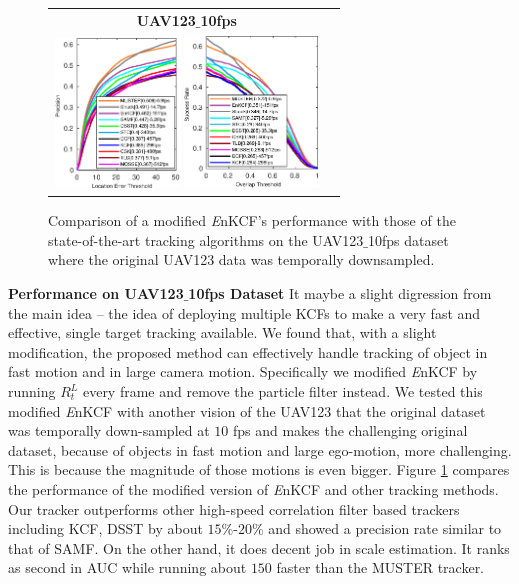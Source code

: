 \documentclass[10pt,twocolumn,letterpaper]{article}
\begin{document}
\begin{figure}[!h]
\centering
\begin{tabular}{cc}
\tiny\quad\textbf{UAV123$\_$10fps}\\
\includegraphics[width=3.30cm]{./figures/pr_uav123_10fps.eps}
\includegraphics[width=3.55cm]{./figures/sr_uav123_10fps.eps}\\
\end{tabular}
\caption{Comparison of a modified {\it E}nKCF's performance with those
  of the state-of-the-art tracking algorithms on the UAV123$\_$10fps
  dataset where the original UAV123 data was temporally downsampled.}
\label{fig:UAV123_10fpsDATASET}
\end{figure}

\textbf{Performance on UAV123$\_$10fps Dataset} It maybe a slight
digression from the main idea -- the idea of deploying multiple KCFs
to make a very fast and effective, single target tracking
available. We found that, with a slight modification, the proposed
method can effectively handle tracking of object in fast motion and in
large camera motion. Specifically we modified {\it E}nKCF by running
$R_{t}^{L}$ every frame and remove the particle filter instead. We
tested this modified {\it E}nKCF with another vision of the UAV123 that
the original dataset was temporally down-sampled at $10$ fps and makes
the challenging original dataset, because of objects in fast motion
and large ego-motion, more challenging. This is because the magnitude
of those motions is even bigger. Figure \ref{fig:UAV123_10fpsDATASET}
compares the performance of the modified version of {\it E}nKCF and
other tracking methods. Our tracker outperforms other high-speed
correlation filter based trackers including KCF, DSST by about
$15\%$-$20\%$ and showed a precision rate similar to that of SAMF. On
the other hand, it does decent job in scale estimation. It ranks as
second in AUC while running about $150$ faster than the MUSTER
tracker.
\end{document}
